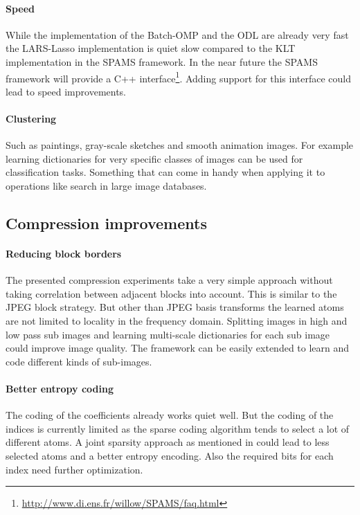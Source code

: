 \paragraph{Speed}
While the implementation of the Batch-OMP and the ODL are already very fast
the LARS-Lasso implementation is quiet slow compared to the KLT implementation
in the SPAMS framework. In the near future the SPAMS framework will provide a
C++ interface\footnote{\url{http://www.di.ens.fr/willow/SPAMS/faq.html}}. Adding
support for this interface could lead to speed improvements. 

\paragraph{Clustering}
 Such as
paintings, gray-scale sketches and smooth animation images. For example
learning dictionaries for very specific classes of images can be used for
classification tasks. Something that can come in handy when applying it to
operations like search in large image databases.


\subsection{Compression improvements}
\paragraph{Reducing block borders} The presented compression experiments
take a very simple approach without taking correlation between adjacent
blocks into account. This is similar to the JPEG block strategy. But other than
JPEG basis transforms the learned atoms are not limited to locality in
the frequency domain. Splitting images in high and low pass sub images and
learning multi-scale dictionaries for each sub image could improve image
quality. The framework can be easily extended to learn and code different kinds
of sub-images.

\paragraph{Better entropy coding}
The coding of the coefficients already works quiet well. But the coding of the
indices is currently limited as the sparse coding algorithm tends to select a
lot of different atoms. A joint sparsity approach as mentioned in
 could lead to less selected atoms and a better
entropy encoding. Also the required bits for each index need further
optimization.









